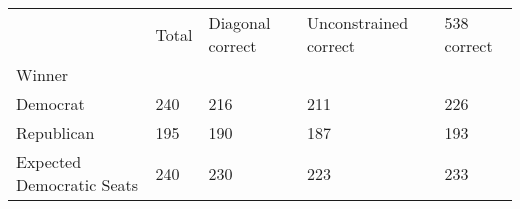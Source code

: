 \begin{tabular}{lllll}
\toprule
{} & Total & Diagonal correct & Unconstrained correct & 538 correct \\
Winner                             &       &                  &                       &             \\
\midrule
Democrat                           &   240 &              216 &                   211 &         226 \\
Republican                         &   195 &              190 &                   187 &         193 \\
\midrule Expected Democratic Seats &   240 &              230 &                   223 &         233 \\
\bottomrule
\end{tabular}
